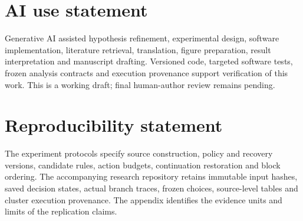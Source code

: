 \section*{AI use statement}
Generative AI assisted hypothesis refinement, experimental design, software
implementation, literature retrieval, translation, figure preparation, result
interpretation and manuscript drafting. Versioned code, targeted software tests,
frozen analysis contracts and execution provenance support verification of this
work. This is a working draft; final human-author review remains pending.

\section*{Reproducibility statement}
The experiment protocols specify source construction, policy and recovery
versions, candidate rules, action budgets, continuation restoration and block
ordering. The accompanying research repository retains immutable input hashes,
saved decision states, actual branch traces, frozen choices, source-level tables
and cluster execution provenance. The appendix identifies the evidence units
and limits of the replication claims.
